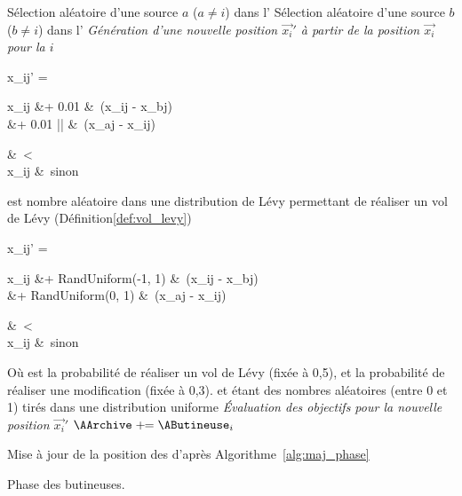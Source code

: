 \begin{algorithm}\label{alg:employed_phase}
  \SetAlgoVlined
  \DontPrintSemicolon
  {
    Sélection aléatoire d’une source $a$ ($a \neq i$) dans l’\AArchive\;
    Sélection aléatoire d’une source $b$ ($b \neq i$) dans l’\AHive\;
    \BlankLine
     \emph{Génération d’une nouvelle position $\vec{x_{i}}'$ à partir de la %
                       position $\vec{x_{i}}$ pour la \AButineuse $i$}\;
    \If{$\ATirageA < \ARatio $ }
      {
      {
      \begin{algomathdisplay}
        x_{ij}' =%
          \begin{cases}
            \begin{aligned}
              x_{ij}  &+ 0.01 \times  \ALevy  &\times \ (x_{ij} - x_{bj})  \\
                      &+ 0.01 \times |\ALevy| &\times \ (x_{aj} - x_{ij})  \\
            \end{aligned} &\ \ATirageB < \AMR \\
            x_{ij}        &\ sinon
          \end{cases}
      \end{algomathdisplay}
      \ALevy est nombre aléatoire dans une distribution de Lévy
      permettant de réaliser un vol de Lévy (Définition\ref{def:vol_levy})\;
      }
      }
    \Else
      {
      {
      \begin{algomathdisplay}
        x_{ij}' =%
          \begin{cases}
            \begin{aligned}
              x_{ij}  &+ RandUniform(-1, 1)   &\times \ (x_{ij} - x_{bj})  \\
                      &+ RandUniform(0, 1)    &\times \ (x_{aj} - x_{ij})  \\
            \end{aligned} &\ \ATirageB < \AMR \\
            x_{ij}        &\ sinon
          \end{cases}
      \end{algomathdisplay}
      }
      }
      Où \ARatio est la probabilité de réaliser un vol de Lévy (fixée à 0,5), et \AMR la probabilité
      de réaliser une modification (fixée à 0,3). \ATirageA et \ATirageB étant des nombres aléatoires
      (entre 0 et 1) tirés dans une distribution uniforme\;
      \BlankLine
     \emph{Évaluation des objectifs pour la nouvelle position $\vec{x_{i}}'$}\;
    {
      $\AArchive \pluseq \AButineuse_{i}$\;
    }
  }
  Mise à jour de la position des \ASources d’après Algorithme~\ref{alg:maj_phase}\;
  \caption{Phase des butineuses.}
\end{algorithm}
\FloatBarrier


